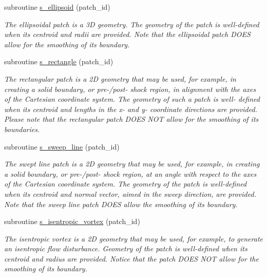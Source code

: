\begin{DoxyCompactItemize}
subroutine \hyperlink{namespacem__initial__condition_a524f37de8423b7943c22c5d105eda922}{s\+\_\+ellipsoid} (patch\+\_\+id)
\begin{DoxyCompactList}\small\item\em The ellipsoidal patch is a 3D geometry. The geometry of the patch is well-\/defined when its centroid and radii are provided. Note that the ellipsoidal patch D\+O\+ES allow for the smoothing of its boundary. \end{DoxyCompactList}\item 
subroutine \hyperlink{namespacem__initial__condition_a9c54a1e384e94493914688f9a2a2cf14}{s\+\_\+rectangle} (patch\+\_\+id)
\begin{DoxyCompactList}\small\item\em The rectangular patch is a 2D geometry that may be used, for example, in creating a solid boundary, or pre-\//post-\/ shock region, in alignment with the axes of the Cartesian coordinate system. The geometry of such a patch is well-\/ defined when its centroid and lengths in the x-\/ and y-\/ coordinate directions are provided. Please note that the rectangular patch D\+O\+ES N\+OT allow for the smoothing of its boundaries. \end{DoxyCompactList}\item 
subroutine \hyperlink{namespacem__initial__condition_ab056c04c30f55423904517abe61ebd99}{s\+\_\+sweep\+\_\+line} (patch\+\_\+id)
\begin{DoxyCompactList}\small\item\em The swept line patch is a 2D geometry that may be used, for example, in creating a solid boundary, or pre-\//post-\/ shock region, at an angle with respect to the axes of the Cartesian coordinate system. The geometry of the patch is well-\/defined when its centroid and normal vector, aimed in the sweep direction, are provided. Note that the sweep line patch D\+O\+ES allow the smoothing of its boundary. \end{DoxyCompactList}\item 
subroutine \hyperlink{namespacem__initial__condition_ab329077796ad7579df0a96543263150d}{s\+\_\+isentropic\+\_\+vortex} (patch\+\_\+id)
\begin{DoxyCompactList}\small\item\em The isentropic vortex is a 2D geometry that may be used, for example, to generate an isentropic flow disturbance. Geometry of the patch is well-\/defined when its centroid and radius are provided. Notice that the patch D\+O\+ES N\+OT allow for the smoothing of its boundary. \end{DoxyCompactList}\item 

\end{DoxyCompactItemize}
